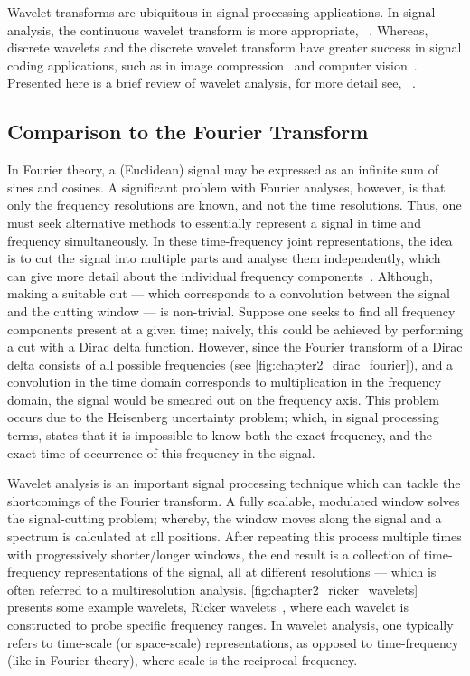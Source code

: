 Wavelet transforms are ubiquitous in signal processing applications.
In signal analysis, the continuous wavelet transform is more appropriate, \eg{}~\cite{Goupillaud1984,KronlandMartinet1987,Flandrin1989,Holschneider1990,Bertrand1990,Pierce1991}.
Whereas, discrete wavelets and the discrete wavelet transform have greater success in signal coding applications, such as in image compression~\cite{Antonini1990,Mallat1992} and computer vision~\cite{Mallat1989,Shensa1992}.
Presented here is a brief review of wavelet analysis, for more detail see, \eg{}~\cite{Rioul1991,Graps1995,Addison2005,Valens1999,Kaiser2011}.

\subsection{Comparison to the Fourier Transform}\label{sec:chapter2_comparison_fourier_transform}

In Fourier theory, a (Euclidean) signal may be expressed as an infinite sum of sines and cosines.
A significant problem with Fourier analyses, however, is that only the frequency resolutions are known, and not the time resolutions.
Thus, one must seek alternative methods to essentially represent a signal in time and frequency simultaneously.
In these time-frequency joint representations, the idea is to cut the signal into multiple parts and analyse them independently, which can give more detail about the individual frequency components~\cite{Mallat2008}.
Although, making a suitable cut --- which corresponds to a convolution between the signal and the cutting window --- is non-trivial.
Suppose one seeks to find all frequency components present at a given time; naively, this could be achieved by performing a cut with a Dirac delta function.
However, since the Fourier transform of a Dirac delta consists of all possible frequencies (see \cref{fig:chapter2_dirac_fourier}), and a convolution in the time domain corresponds to multiplication in the frequency domain, the signal would be smeared out on the frequency axis.
This problem occurs due to the Heisenberg uncertainty problem; which, in signal processing terms, states that it is impossible to know both the exact frequency, and the exact time of occurrence of this frequency in the signal.

Wavelet analysis is an important signal processing technique which can tackle the shortcomings of the Fourier transform.
A fully scalable, modulated window solves the signal-cutting problem; whereby, the window moves along the signal and a spectrum is calculated at all positions.
After repeating this process multiple times with progressively shorter/longer windows, the end result is a collection of time-frequency representations of the signal, all at different resolutions --- which is often referred to a multiresolution analysis.
\cref{fig:chapter2_ricker_wavelets} presents some example wavelets, Ricker wavelets~\cite{Ricker1953}, where each wavelet is constructed to probe specific frequency ranges.
In wavelet analysis, one typically refers to time-scale (or space-scale) representations, as opposed to time-frequency (like in Fourier theory), where scale is the reciprocal frequency.

